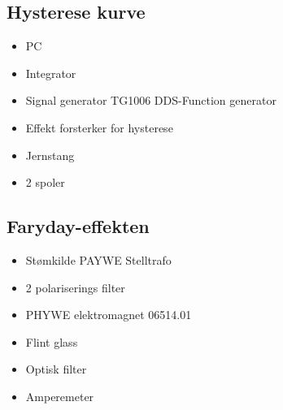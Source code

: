 \documentclass[norsk,a4paper,12pt]{article}
\begin{document}
\begin{appendices}
\subsection{Hysterese kurve}
\begin{multicols}{2}
\begin{itemize}
  	\item PC 
	\item Integrator
	\item Signal generator TG1006 DDS-Function generator
	\item Effekt forsterker for hysterese 
	\item Jernstang
	\item 2 spoler
\end{itemize}
\end{multicols}
\subsection{Faryday-effekten}
\begin{multicols}{2}
\begin{itemize}
  	\item Stømkilde PAYWE Stelltrafo
	\item 2 polariserings filter
	\item PHYWE elektromagnet 06514.01
	\item Flint glass
	\item Optisk filter
	\item Amperemeter 
\end{itemize}
\end{multicols}

\end{appendices}
\end{document}
